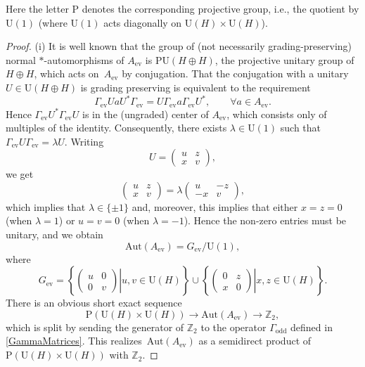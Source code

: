 \documentclass[10pt,a4paper]{amsart}
\numberwithin{equation}{section}
\newcommand{\Z}{\mathbb{Z}}
\newcommand{\Aut}{\mathrm{Aut}}
\newcommand{\U}{\mathrm{U}}
\begin{document}
Here the letter $\mathrm{P}$ denotes the corresponding projective group, i.e., the quotient by $\U(1)$ (where $\U(1)$ acts diagonally on $\U(H) \times \U(H)$).

\begin{proof}
(i) It is well known that the group of (not necessarily grading-preserving) normal $*$-automorphisms of $A_{\mathrm{ev}}$ is $\mathrm{PU}(H \oplus H)$, the projective unitary group of $H \oplus H$, which acts on~$A_{\mathrm{ev}}$ by conjugation.
That the conjugation with a unitary $U \in \U(H\oplus H)$ is grading preserving is equivalent to the requirement
\begin{equation*}
 \Gamma_{\mathrm{ev}} U a U^* \Gamma_{\mathrm{ev}} = U \Gamma_{\mathrm{ev}} a \Gamma_{\mathrm{ev}} U^*, \qquad \forall a \in A_{\mathrm{ev}}.
\end{equation*}
Hence $\Gamma_{\mathrm{ev}}U^*\Gamma_{\mathrm{ev}} U$ is in the (ungraded) center of $A_{\mathrm{ev}}$, which consists only of multiples of the identity.
Consequently, there exists $\lambda \in \U(1)$ such that $\Gamma_{\mathrm{ev}} U\Gamma_{\mathrm{ev}} = \lambda U$.
Writing
\begin{equation*}
 U = \begin{pmatrix} u & z \\ x & v \end{pmatrix},
 \end{equation*}
 we get
 \begin{equation*}
 \begin{pmatrix} u & z \\ x & v \end{pmatrix} = \lambda\begin{pmatrix} u & -z \\ -x & v \end{pmatrix},
\end{equation*}
which implies that $\lambda \in \{\pm 1\}$ and, moreover, this implies that either $x = z = 0$ (when $\lambda = 1$) or $u = v = 0$ (when $\lambda = -1$).
Hence the non-zero entries must be unitary, and we obtain
\begin{equation*}	%
\Aut(A_{\mathrm{ev}}) = G_{\mathrm{ev}}/\U(1),
\end{equation*}
where
\begin{equation} \label{DefGev}
 G_{\mathrm{ev}} = \left\{ \left.\begin{pmatrix} u & 0 \\ 0 & v \end{pmatrix} \right| u, v \in \U(H)\right\} \cup \left\{ \left.\begin{pmatrix} 0 & z \\ x & 0 \end{pmatrix} \right| x, z \in \U(H)\right\}.
\end{equation}
There is an obvious short exact sequence
\begin{equation*}
\mathrm{P}(\U(H) \times \U(H)) \to \Aut(A_{\mathrm{ev}}) \to \Z_2,
\end{equation*}
which is split by sending the generator of $\Z_2$ to the operator $\Gamma_{\mathrm{odd}}$ defined in \eqref{GammaMatrices}.
This realizes~$\Aut(A_{\mathrm{ev}})$ as a semidirect product of $\mathrm{P}(\U(H) \times \U(H))$ with $\Z_2$.


\end{proof}
\end{document}
